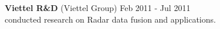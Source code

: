 \documentclass[margin, 10pt]{res} %
\begin{document}
\begin{resume}
%
% 



\textbf{Viettel R\&D} (Viettel Group)		\hfill Feb 2011 - Jul 2011 \\
conducted research on Radar data fusion and applications.


\end{resume}
\end{document}

